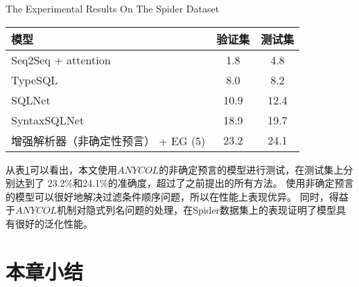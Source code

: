 \begin{table}[!htpb]
    {The Experimental Results On The Spider Dataset}
  \label{tab:ssjjsdsyjg}
  \centering
  \begin{threeparttable}[b]
     \begin{tabular}{lcc}
      \toprule
      模型 & 验证集 & 测试集\\
      \midrule
      Seq2Seq + attention & 1.8	& 4.8\\
      TypeSQL & 8.0	& 8.2\\
      SQLNet & 10.9	& 12.4\\
      SyntaxSQLNet & 18.9	& 19.7\\
      增强解析器（非确定性预言） + EG (5) & 23.2  & 24.1\\
      \bottomrule
    \end{tabular}
  \end{threeparttable}
\end{table}

从表\ref{tab:ssjjsdsyjg}可以看出，本文使用$ANYCOL$的非确定预言的模型进行测试，在测试集上分别达到了 23.2\%和24.1\%的准确度，超过了之前提出的所有方法。
使用非确定预言的模型可以很好地解决过滤条件顺序问题，所以在性能上表现优异。
同时，得益于$ANYCOL$机制对隐式列名问题的处理，在Spider数据集上的表现证明了模型具有很好的泛化性能。

\section{本章小结}

